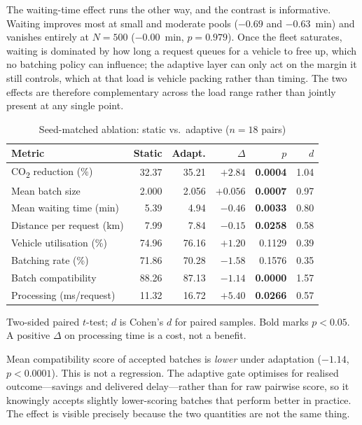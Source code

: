 \documentclass[conference]{IEEEtran}
\begin{document}
The waiting-time effect runs the other way, and the contrast is informative.
Waiting improves most at small and moderate pools ($-0.69$ and $-0.63$~min)
and vanishes entirely at $N=500$ ($-0.00$~min, $p=0.979$). Once the fleet
saturates, waiting is dominated by how long a request queues for a vehicle to
free up, which no batching policy can influence; the adaptive layer can only
act on the margin it still controls, which at that load is vehicle packing
rather than timing. The two effects are therefore complementary across the
load range rather than jointly present at any single point.

\begin{table}[t]
\caption{Seed-matched ablation: static vs.\ adaptive ($n=18$ pairs)}
\label{tab:ablation}
\centering
\footnotesize
\setlength{\tabcolsep}{3.4pt}
\begin{tabular}{@{}lrrrrr@{}}
\toprule
Metric & Static & Adapt. & $\Delta$ & $p$ & $d$ \\
\midrule
CO\textsubscript{2} reduction (\%) & 32.37 & 35.21 & $+2.84$ & \textbf{0.0004} & 1.04 \\
Mean batch size            & 2.000 & 2.056 & $+0.056$ & \textbf{0.0007} & 0.97 \\
Mean waiting time (min)    & 5.39  & 4.94  & $-0.46$ & \textbf{0.0033} & 0.80 \\
Distance per request (km)  & 7.99  & 7.84  & $-0.15$ & \textbf{0.0258} & 0.58 \\
Vehicle utilisation (\%)   & 74.96 & 76.16 & $+1.20$ & 0.1129 & 0.39 \\
Batching rate (\%)         & 71.86 & 70.28 & $-1.58$ & 0.1576 & 0.35 \\
Batch compatibility        & 88.26 & 87.13 & $-1.14$ & \textbf{0.0000} & 1.57 \\
Processing (ms/request)    & 11.32 & 16.72 & $+5.40$ & \textbf{0.0266} & 0.57 \\
\bottomrule
\end{tabular}
\vspace{2pt}
\begin{minipage}{\columnwidth}\raggedright\scriptsize
Two-sided paired $t$-test; $d$ is Cohen's $d$ for paired samples. Bold marks
$p<0.05$. A positive $\Delta$ on processing time is a cost, not a benefit.
\end{minipage}
\end{table}

Mean compatibility score of accepted batches is \emph{lower} under adaptation
($-1.14$, $p<0.0001$). This is not a regression. The adaptive gate optimises
for realised outcome---savings and delivered delay---rather than for raw
pairwise score, so it knowingly accepts slightly lower-scoring batches that
perform better in practice. The effect is visible precisely because the two
quantities are not the same thing.
\end{document}
